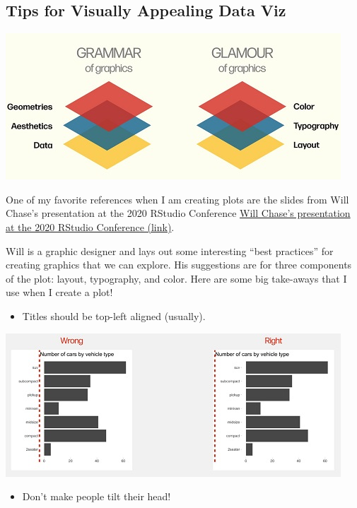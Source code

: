 \documentclass[
]{article}
\providecommand{\tightlist}{%
  \setlength{\itemsep}{0pt}\setlength{\parskip}{0pt}}
\begin{document}
\hypertarget{tips-for-visually-appealing-data-viz}{%
\subsection{Tips for Visually Appealing Data
Viz}\label{tips-for-visually-appealing-data-viz}}

\includegraphics{images/glamour_of_graphics.JPG}

One of my favorite references when I am creating plots are the slides
from Will Chase's presentation at the 2020 RStudio Conference
\href{https://www.williamrchase.com/slides/assets/player/KeynoteDHTMLPlayer.html\#0}{Will
Chase's presentation at the 2020 RStudio Conference (link)}.

Will is a graphic designer and lays out some interesting ``best
practices'' for creating graphics that we can explore. His suggestions
are for three components of the plot: layout, typography, and color.
Here are some big take-aways that I use when I create a plot!

\begin{itemize}
\tightlist
\item
  Titles should be top-left aligned (usually).
\end{itemize}

\includegraphics{images/alignment.JPG}

\newpage

\begin{itemize}
\tightlist
\item
  Don't make people tilt their head!
\end{itemize}
\end{document}
